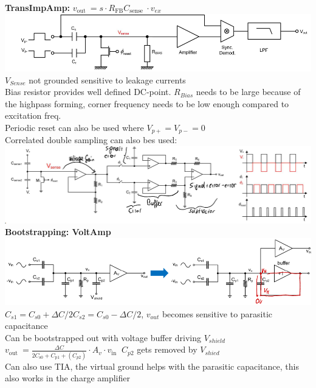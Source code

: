 \documentclass[5pt,landscape]{article}
\begin{document}
\begin{multicols*}{5}
\textbf{TransImpAmp:} $ v_{\text {out }}=s \cdot R_{\mathrm{FB}} C_{\text {sense }} \cdot v_{e x} $\\
\includegraphics[width=\columnwidth]{images/dc_pot_capa.png}\\
$ V_{Sense} $ not grounded sensitive to leakage currents\\
Bias resistor provides well defined DC-point. $ R_{Bias} $ needs to be large because of the highpass forming, corner frequency needs to be low enough compared to excitation freq. \\
Periodic reset can also be used where $ V_{p+} = V_{p-} =0  $\\
Correlated double sampling can also bes used:\\
\includegraphics[width=\columnwidth]{images/corr_double_sample.png}\\
\textbf{Bootstrapping: VoltAmp}\\
\includegraphics[width=\columnwidth]{images/bootstrapping.png}\\
$ C_{s 1}=C_{s 0}+\Delta C / 2 $$ C_{s 2}=C_{s 0}-\Delta C / 2 $, $ v_{out} $ becomes sensitive to parasitic capacitance\\
Can be bootstrapped out with voltage buffer driving $ V_{shield} $\\
$ v_{\text {out }}=\frac{\Delta C}{2 C_{\mathrm{s} 0}+C_{\mathrm{p} 1} +(C_{p2})} \cdot A_{v} \cdot v_{\text {in }} $ $ C_{p2} $ gets removed by $V_{shied} $\\
Can also use TIA, the virtual ground helps with the parasitic capacitance, this also works in the charge amplifier\\
$$
\end{multicols*}
\end{document}
